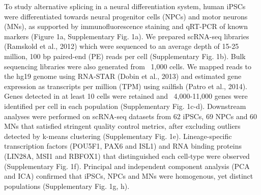 To study alternative splicing in a neural differentiation system, human iPSCs were differentiated towards neural progenitor cells (NPCs) and motor neurons (MNs), as supported by immunofluorescence staining and qRT-PCR of known markers (Figure 1a, Supplementary Fig. 1a). We prepared scRNA-seq libraries (Ramskold et al., 2012) which were sequenced to an average depth of 15-25 million, 100 bp paired-end (PE) reads per cell (Supplementary Fig. 1b). Bulk sequencing libraries were also generated from ~1,000 cells. We mapped reads to the hg19 genome using RNA-STAR (Dobin et al., 2013) and estimated gene expression as transcripts per million (TPM) using sailfish (Patro et al., 2014). Genes detected in at least 10 cells were retained and ~4,000-11,000 genes were identified per cell in each population (Supplementary Fig. 1c-d). Downstream analyses were performed on scRNA-seq datasets from 62 iPSCs, 69 NPCs and 60 MNs that satisfied stringent quality control metrics, after excluding outliers detected by k-means clustering (Supplementary Fig. 1e). Lineage-specific transcription factors (POU5F1, PAX6 and ISL1) and RNA binding proteins (LIN28A, MSI1 and RBFOX1) that distinguished each cell-type were observed (Supplementary Fig. 1f). Principal and independent component analysis (PCA and ICA) confirmed that iPSCs, NPCs and MNs were homogenous, yet distinct populations (Supplementary Fig. 1g, h).

